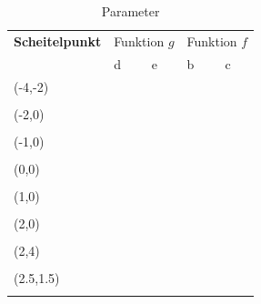 \documentclass[12pt]{article}
\begin{document}
\begin{table}\scriptsize
\begin{center}
\begin{tabularx}{0.75\linewidth}{|l|X|X|X|X|}
\toprule 
\textbf{Scheitelpunkt} & \multicolumn{2}{c|}{Funktion $g$} & \multicolumn{2}{c|}{Funktion $f$}\\
& d & e & b & c\\
\midrule
(-4,-2) & & & &\\
& & & &\\
\hline
(-2,0) & & & &\\
& & & & \\
\hline
(-1,0) & & & &\\
& & & & \\
\hline
(0,0) & & & &\\
& & & & \\
\hline
(1,0) & & & &\\
& & & & \\
\hline
(2,0) & & & &\\
& & & & \\
\hline
(2,4) & & & &\\
& & & & \\
\hline
(2.5,1.5) & & & &\\
& & & & \\
\bottomrule
\end{tabularx}
\caption{Parameter}\label{tab:params}
\end{center}
\end{table}
\newpage
\end{document}
